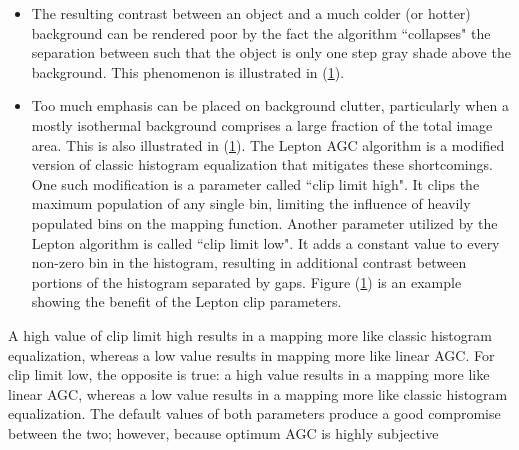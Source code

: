 \begin{itemize}
    \item The resulting contrast between an object and a much colder (or hotter)
background can be rendered poor by the fact the algorithm ``collapses" the
separation between such that the object is only one step gray shade above the
background. This phenomenon is illustrated in (\ref{fig:comparisionlinearAGC}).
    \item Too much emphasis can be placed on background clutter, particularly
when a mostly isothermal background comprises a large fraction of the total
image area. This is also illustrated in (\ref{fig:comparisionlinearAGC}). The
Lepton AGC algorithm is a modified version of classic histogram equalization
that mitigates these shortcomings. One such modification is a parameter called
``clip limit high". It clips the maximum population of any single bin, limiting
the influence of heavily populated bins on the mapping function. Another
parameter utilized by the Lepton algorithm is called ``clip limit low". It adds
a constant value to every non-zero bin in the histogram, resulting in additional
contrast between portions of the histogram separated by gaps.
Figure (\ref{fig:comparisionlinearAGC}) is an example showing the benefit of the 
Lepton clip parameters.
%
\end{itemize}
\begin{figure}[htb]
    \centering
     \quad
     \quad
    \label{fig:comparisionlinearAGC}
\end{figure}
%
\noindent A high value of clip limit high results in a mapping more like classic histogram
equalization, whereas a low value results in mapping more like linear AGC. For
clip limit low, the opposite is true: a high value results in a mapping more
like linear AGC, whereas a low value results in a mapping more like classic
histogram equalization. The default values of both parameters produce a good
compromise between the two; however, because optimum AGC is highly subjective
